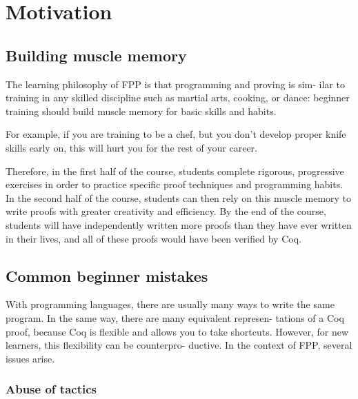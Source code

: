 
\chapter{Motivation} %

\label{motivation} %


\section{Building muscle memory}
The learning philosophy of FPP is that programming and proving is sim- ilar to training in any skilled discipline such as martial arts, cooking, or dance: beginner training should build muscle memory for basic skills and habits.

For example, if you are training to be a chef, but you don’t develop proper knife skills early on, this will hurt you for the rest of your career.

Therefore, in the first half of the course, students complete rigorous, progressive exercises in order to practice specific proof techniques and programming habits. In the second half of the course, students can then rely on this muscle memory to write proofs with greater creativity and efficiency. By the end of the course, students will have independently written more proofs than they have ever written in their lives, and all of these proofs would have been verified by Coq.

\section{Common beginner mistakes}

With programming languages, there are usually many ways to write the same program. In the same way, there are many equivalent represen- tations of a Coq proof, because Coq is flexible and allows you to take shortcuts. However, for new learners, this flexibility can be counterpro- ductive. In the context of FPP, several issues arise.


\subsection{Abuse of tactics}

